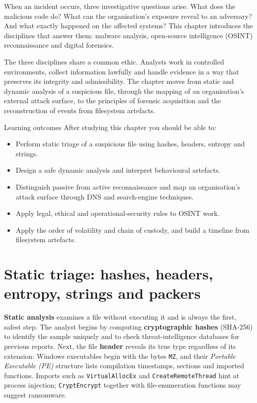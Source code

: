 \documentclass[11pt,openany]{book}
\begin{document}
When an incident occurs, three investigative questions arise. What does the malicious code do? What can the organisation's exposure reveal to an adversary? And what exactly happened on the affected systems? This chapter introduces the disciplines that answer them: malware analysis, open-source intelligence (OSINT) reconnaissance and digital forensics.

The three disciplines share a common ethic. Analysts work in controlled environments, collect information lawfully and handle evidence in a way that preserves its integrity and admissibility. The chapter moves from static and dynamic analysis of a suspicious file, through the mapping of an organisation's external attack surface, to the principles of forensic acquisition and the reconstruction of events from filesystem artefacts.

\begin{outcomesbox}{Learning outcomes}
After studying this chapter you should be able to:
\begin{itemize}
  \item Perform static triage of a suspicious file using hashes, headers, entropy and strings.
  \item Design a safe dynamic analysis and interpret behavioural artefacts.
  \item Distinguish passive from active reconnaissance and map an organisation's attack surface through DNS and search-engine techniques.
  \item Apply legal, ethical and operational-security rules to OSINT work.
  \item Apply the order of volatility and chain of custody, and build a timeline from filesystem artefacts.
\end{itemize}
\end{outcomesbox}

\section{Static triage: hashes, headers, entropy, strings and packers}\label{sec:12.1}
\textbf{Static analysis} examines a file without executing it and is always the first, safest step. The analyst begins by computing \textbf{cryptographic hashes} (SHA-256) to identify the sample uniquely and to check threat-intelligence databases for previous reports. Next, the file \textbf{header} reveals its true type regardless of its extension: Windows executables begin with the bytes \texttt{MZ}, and their \emph{Portable Executable (PE)} structure lists compilation timestamps, sections and imported functions. Imports such as \texttt{VirtualAllocEx} and \texttt{CreateRemoteThread} hint at process injection; \texttt{CryptEncrypt} together with file-enumeration functions may suggest ransomware.
\end{document}

